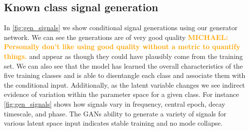 \documentclass[12pt]{iopart}
\newcommand{\michael}[1]{\textbf{\textcolor{orange}{MICHAEL: #1}}}
\begin{document}
\subsection{Known class signal generation}
In \cref{fig:gen_signals} we show conditional signal generations using our generator network. We can see the generations are of very good quality \michael{Personally don't like using good quality without a metric to quantify things.} and appear as though they could have plausibly come from the training set. We can also see that the model has learned the overall characteristics of the five training classes and is able to disentangle each class and associate them with the conditional input. Additionally, as the latent variable changes we see indirect evidence of variation within the parameter space for a given class. For instance \cref{fig:gen_signals} shows how signals vary in frequency, central epoch, decay timescale, and phase. The \acp{GAN} ability to generate a variety of signals for various latent space input indicates stable training and no mode collapse. 
\end{document}
